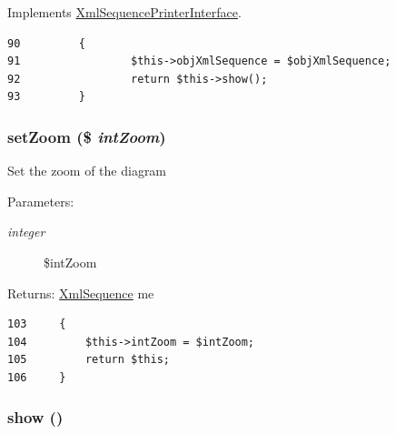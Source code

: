 Implements \hyperlink{interface_xml_sequence_printer_interface_7a8a4630e9f25847da0a6de87a5ab7e0}{XmlSequencePrinterInterface}.

\begin{Code}\begin{verbatim}90         {
91                 $this->objXmlSequence = $objXmlSequence;
92                 return $this->show();   
93         }
\end{verbatim}
\end{Code}


\hypertarget{class_xml_sequence_printer_diagram_581d130f5746b5b63036e6f7ee5208fd}{
\subsubsection[{setZoom}]{\setlength{\rightskip}{0pt plus 5cm}setZoom (\$ {\em intZoom})}}
\label{class_xml_sequence_printer_diagram_581d130f5746b5b63036e6f7ee5208fd}


Set the zoom of the diagram

\begin{Desc}
\item[Parameters:]
\begin{description}
\item[{\em integer}]\$intZoom \end{description}
\end{Desc}
\begin{Desc}
\item[Returns:]\hyperlink{class_xml_sequence}{XmlSequence} me \end{Desc}


\begin{Code}\begin{verbatim}103     {
104         $this->intZoom = $intZoom;
105         return $this;
106     }
\end{verbatim}
\end{Code}


\hypertarget{class_xml_sequence_printer_diagram_2b8e3779f5bd8c38f70307574859bd36}{
\subsubsection[{show}]{\setlength{\rightskip}{0pt plus 5cm}show ()}}
\label{class_xml_sequence_printer_diagram_2b8e3779f5bd8c38f70307574859bd36}




